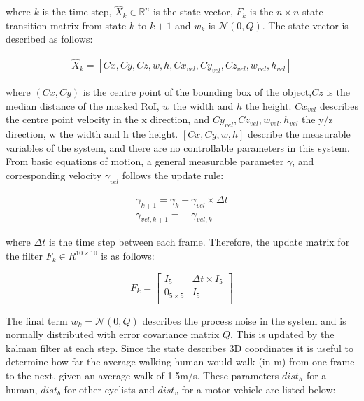 \documentclass[11pt,twoside]{report}
\begin{document}
where $k$ is the time step, $\hat{X}_{k} \in \mathbb{R}^{n}$ is the state vector, $F_{k}$ is the $n \times n$ state transition matrix from state $k$ to $k+1$ and $w_{k}$ is $\mathcal{N}(0,Q)$. The state vector is described as follows:

\begin{equation}
\begin{aligned}
\hat{X}_{k} =  [Cx,Cy,Cz,w,h,Cx_{vel},Cy_{vel},Cz_{vel},w_{vel},h_{vel}]
\end{aligned}
\end{equation}

where $(Cx,Cy)$ is the centre point of the bounding box of the object,$Cz$ is the median distance of the masked RoI, $w$ the width and $h$ the height. $Cx_{vel}$ describes the centre point velocity in the x direction, and $Cy_{vel},Cz_{vel},w_{vel},h_{vel}$ the y/z direction, w the width and h the height. $[Cx,Cy,w,h]$ describe the measurable variables of the system, and there are no controllable parameters in this system. From basic equations of motion, a general measurable parameter $\gamma$, and corresponding velocity  $\gamma_{vel}$ follows the update rule:

\begin{equation}
\begin{aligned}
\gamma_{k+1} = \gamma_{k} + \gamma_{vel} \times \Delta t \\
\gamma_{vel,k+1} = \quad \gamma_{vel,k}
\end{aligned}
\end{equation}

where $\Delta t$ is the time step between each frame. Therefore, the update matrix for the filter $F_{k} \in R^{10 \times 10}$ is as follows:

\begin{equation}
F_{k} = 
\begin{bmatrix}
I_{5} & \Delta t \times I_{5} \\[0.3em]

0_{5 \times 5} & I_{5} \\[0.3em]
\end{bmatrix}
\end{equation}

The final term $w_{k} = \mathcal{N}(0,Q)$ describes the process noise in the system and is normally distributed with error covariance matrix $Q$. This is updated by the kalman filter at each step. Since the state describes 3D coordinates it is useful to determine how far the average walking human would walk (in m) from one frame to the next, given an average walk of 1.5m/s. These parameters $dist_{h}$ for a human, $dist_{b}$ for other cyclists and $dist_{v}$ for a motor vehicle are listed below:
\end{document}
